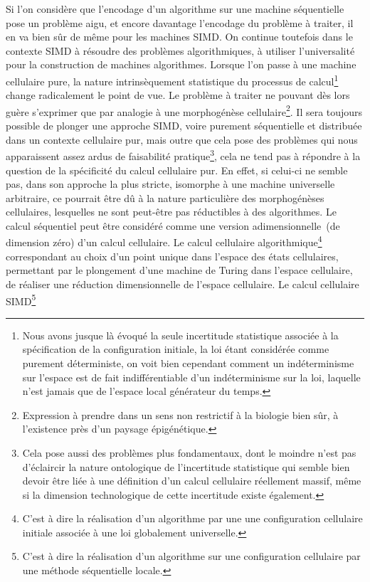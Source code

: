 Si l'on considère que l'encodage d'un algorithme sur une machine
séquentielle pose un problème aigu, et encore davantage
l'encodage du problème à traiter, il en va bien sûr de même pour les
machines SIMD. %
On continue toutefois dans le contexte SIMD à résoudre des problèmes
algorithmiques, à utiliser l'universalité pour la construction de
machines algorithmes. %
Lorsque l'on passe à une machine cellulaire pure, la nature
intrinsèquement statistique du processus de calcul\footnote{%
  Nous avons jusque là évoqué la seule incertitude statistique
  associée à la spécification de la configuration initiale, la loi
  étant considérée comme purement déterministe, on voit bien cependant
  comment un indéterminisme sur l'espace est de fait indifférentiable
  d'un indéterminisme sur la loi, laquelle n'est jamais que de
  l'espace local générateur du temps.} %
change radicalement le point de vue. %
Le problème à traiter ne pouvant dès lors guère s'exprimer que par
analogie à une morphogénèse
cellulaire\footnote{%
  Expression à prendre dans un sens non restrictif à la biologie bien
  sûr, à l'existence près d'un paysage épigénétique.}. %
Il sera toujours possible de plonger une approche SIMD, voire
purement séquentielle et distribuée dans un contexte cellulaire pur,
mais outre que cela pose des problèmes qui nous apparaissent assez
ardus de faisabilité pratique\footnote{%
  Cela pose aussi des problèmes plus fondamentaux, dont le moindre
  n'est pas d'éclaircir la nature ontologique de l'incertitude
  statistique qui semble bien devoir être liée à une définition d'un
  calcul cellulaire réellement massif, même si la dimension
  technologique de cette incertitude existe également.}, %
cela ne tend pas à répondre à la
question de la spécificité du calcul cellulaire pur. %
En effet, si celui-ci ne semble pas, dans son approche la plus stricte,
isomorphe à une machine universelle arbitraire, ce pourrait être dû à
la nature particulière des morphogénèses cellulaires, lesquelles ne
sont peut-être pas réductibles à des algorithmes. %
Le calcul séquentiel peut être considéré comme une version
adimensionnelle~(de dimension zéro) d'un calcul cellulaire. %
Le calcul cellulaire algorithmique\footnote{%
  C'est à dire la réalisation d'un algorithme par une une
  configuration cellulaire initiale associée à une loi globalement
  universelle.} %
correspondant au choix d'un point unique dans l'espace des états
cellulaires, permettant par le plongement d'une machine de Turing dans
l'espace cellulaire, de réaliser une réduction
dimensionnelle de l'espace cellulaire. %
Le calcul cellulaire SIMD\footnote{%
  C'est à dire la réalisation d'un algorithme sur une configuration
  cellulaire par une méthode séquentielle locale.} %
